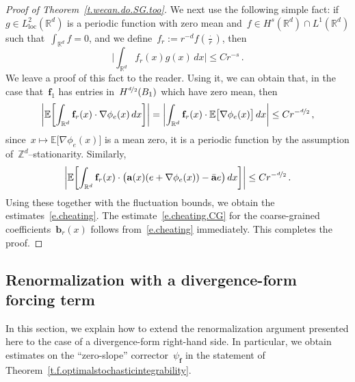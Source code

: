 \documentclass[11pt,twoside]{article} %
\numberwithin{equation}{section}
\theoremstyle{definition}
\newcommand*{\Zd}{\ensuremath{\mathbb{Z}^d}}
\newcommand*{\Rd}{\ensuremath{\mathbb{R}^d}}
\renewcommand{\b}{\ensuremath{\mathbf{b}}}
\newcommand{\f}{\mathbf{f}}
\renewcommand{\a}{\mathbf{a}}
\newcommand{\ahom}{\bar{\a}}
\newcommand{\E}{\mathbb{E}}
\begin{document}
\begin{proof}[{Proof of Theorem~\ref{t.wecan.do.SG.too}}]
We next use the following simple fact: if~$g \in L^2_{\mathrm{loc}}(\Rd)$ is a periodic function with zero mean and~$f \in H^{s}(\Rd)\cap L^1(\Rd)$ such that~$\int_{\Rd} f = 0$, and we define~$f_r:= r^{-d} f(\frac\cdot r)$, then 
\begin{equation*}
\biggl| \int_{\Rd} f_r(x) g(x)\,dx \biggr| \leq Cr^{-s}\,.
\end{equation*}
We leave a proof of this fact to the reader. 
Using it, we can obtain that, in the case that~$\f_1$ has entries in~$H^{\nicefrac d2}(B_1)$ which have zero mean, then 
\begin{equation*}
\biggl| \E \biggl[ \int_{\Rd} \f_r(x)\cdot \nabla \phi_e(x)\,dx \biggr] \biggr| 
=
\biggl|  \int_{\Rd} \f_r(x)\cdot \E \bigl[\nabla \phi_e(x)\bigr] \,dx  \biggr| 
\leq Cr^{-\nicefrac d2}\,,
\end{equation*}
since~$x\mapsto \E \bigl[ \nabla \phi_e(x) \bigr]$ is a mean zero, it is a periodic function by the assumption of~$\Zd$--stationarity. 
Similarly, 
\begin{equation*}
\biggl| \E \biggl[ \int_{\Rd} \f_r(x)\cdot \bigl( \a(x)(e+ \nabla \phi_e(x)) -\ahom e \bigr) \,dx \biggr] \biggr| 
\leq 
Cr^{-\nicefrac d2}\,.
\end{equation*}
Using these together with the fluctuation bounds, we obtain the estimates~\eqref{e.cheating}. The estimate~\eqref{e.cheating.CG} for the coarse-grained coefficients~$\b_r(x)$ follows from~\eqref{e.cheating} immediately. 
This completes the proof. 
\end{proof}


\subsection{Renormalization with a divergence-form forcing term}
\label{ss.rhs.optimal}

In this section, we explain how to extend the renormalization argument presented here to the case of a divergence-form right-hand side. In particular, we obtain estimates on the ``zero-slope'' corrector~$\psi_{\f}$ in the statement of Theorem~\ref{t.f.optimalstochasticintegrability}. 

\smallskip
\end{document}
